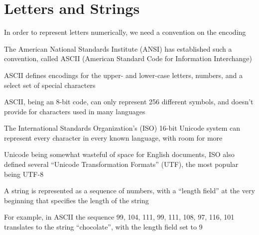 \documentclass[8pt,a4paper,compress]{beamer}
\begin{document}
\section{Letters and Strings}
\begin{frame}[fragile]
\pause

In order to represent letters numerically, we need a convention on the encoding

\pause
\bigskip

The American National Standards Institute (ANSI) has established such a convention, called ASCII (American Standard Code for Information Interchange)

\pause
\bigskip

ASCII defines encodings for the upper- and lower-case letters, numbers, and a select set of special characters

\pause
\bigskip

ASCII, being an 8-bit code, can only represent 256 different symbols, and doesn't provide for characters used in many languages

\pause
\bigskip

The International Standards Organization's (ISO) 16-bit Unicode system can represent every character in every known language, with room for more

\pause
\bigskip

Unicode being somewhat wasteful of space for English documents, ISO also defined several ``Unicode Transformation Formats'' (UTF), the most popular being UTF-8 
\end{frame}

\begin{frame}[fragile]
\pause

A string is represented as a sequence of numbers, with a ``length field'' at the very beginning that specifies the length of the string

\pause
\bigskip

For example, in ASCII the sequence 99, 104, 111, 99, 111, 108, 97, 116, 101 translates to the string ``chocolate'', with the length field set to 9
\end{frame}
\end{document}
